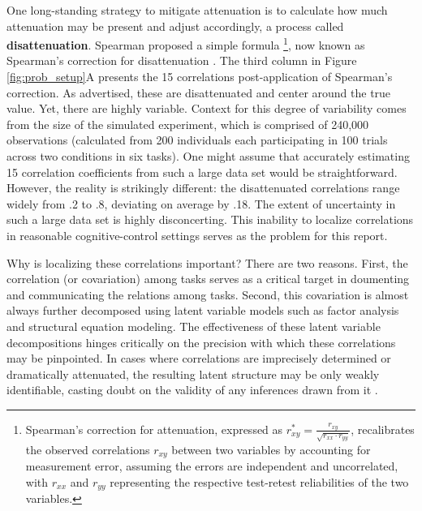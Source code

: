 \documentclass[man, 12pt]{apa7} %
\begin{document}
One long-standing strategy to mitigate attenuation is to calculate how much attenuation may be present and adjust accordingly, a process called \textbf{disattenuation}. Spearman proposed a simple formula \footnote{Spearman's correction for attenuation, expressed as $r^*_{xy} = \frac{r_{xy}}{\sqrt{r_{xx}\cdot r_{yy}}}$, recalibrates the observed correlations $r_{xy}$ between two variables by accounting for measurement error, assuming the errors are independent and uncorrelated, with $r_{xx}$ and $r_{yy}$ representing the respective test-retest reliabilities of the two variables.}, now known as Spearman's correction for disattenuation \parencite{Spearman.1987}. The third column in Figure \ref{fig:prob_setup}A presents the 15 correlations post-application of Spearman's correction. As advertised, these are disattenuated and center around the true value.  Yet, there are highly variable.  Context for this degree of variability comes from the size of the simulated experiment, which is comprised of 240,000 observations (calculated from 200 individuals each participating in 100 trials across two conditions in six tasks).  One might assume that accurately estimating 15 correlation coefficients from such a large data set would be straightforward. However, the reality is strikingly different: the disattenuated correlations range widely from .2 to .8, deviating on average by .18. The extent of uncertainty in such a large data set is highly disconcerting. This inability to localize correlations in reasonable cognitive-control settings serves as the problem for this report.



Why is localizing these correlations important?  There are two reasons.  First, the correlation (or covariation) among tasks serves as a critical target in doumenting and communicating the relations among tasks.  Second, this covariation is almost always further decomposed using latent variable models such as factor analysis and structural equation modeling.  The effectiveness of these latent variable decompositions hinges critically on the precision with which these correlations may be pinpointed. In cases where correlations are imprecisely determined or dramatically attenuated, the resulting latent structure may be only weakly identifiable, casting doubt on the validity of any inferences drawn from it \parencite{Karr.etal.2018}.
\end{document}
